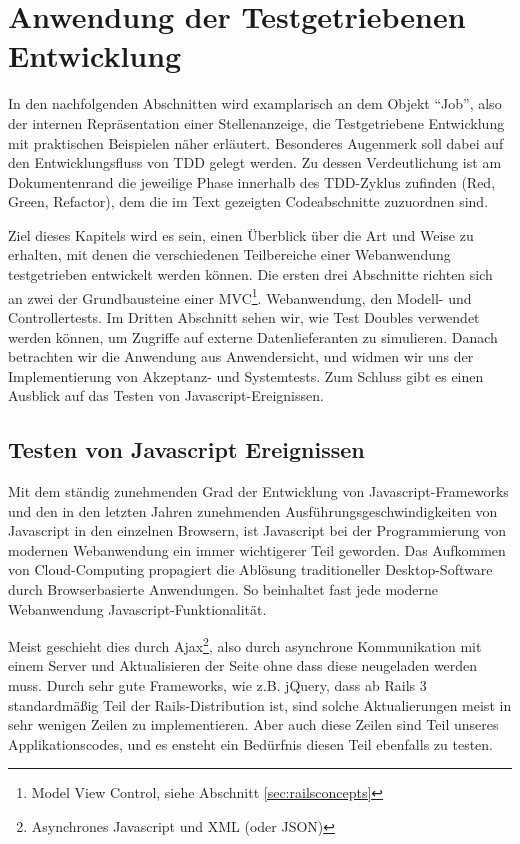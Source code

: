 \section{Anwendung der Testgetriebenen Entwicklung}
\label{sec:awtdd}

In den nachfolgenden Abschnitten wird examplarisch an dem Objekt "`Job"', also der internen Repräsentation einer Stellenanzeige, die Testgetriebene Entwicklung mit praktischen Beispielen näher erläutert.
Besonderes Augenmerk soll dabei auf den Entwicklungsfluss von TDD gelegt werden. Zu dessen Verdeutlichung ist am Dokumentenrand die jeweilige Phase innerhalb des TDD-Zyklus zufinden (Red, Green, Refactor), dem die im Text gezeigten Codeabschnitte zuzuordnen sind.

Ziel dieses Kapitels wird es sein, einen Überblick über die Art und Weise zu erhalten, mit denen die verschiedenen Teilbereiche einer Webanwendung testgetrieben entwickelt werden können.
Die ersten drei Abschnitte richten sich an zwei der Grundbausteine einer MVC\footnote{Model View Control, siehe Abschnitt \ref{sec:railsconcepts}}.
Webanwendung, den Modell- und Controllertests. Im Dritten Abschnitt sehen wir, wie Test Doubles verwendet werden können, um Zugriffe auf externe Datenlieferanten zu simulieren. Danach betrachten wir die Anwendung aus Anwendersicht, und widmen wir uns der Implementierung von Akzeptanz- und Systemtests. %
Zum Schluss gibt es einen Ausblick auf das Testen von Javascript-Ereignissen.






\subsection{Testen von Javascript Ereignissen}

Mit dem ständig zunehmenden Grad der Entwicklung von Javascript-Frameworks und den in den letzten Jahren zunehmenden Ausführungsgeschwindigkeiten von Javascript in den einzelnen Browsern, ist Javascript bei der Programmierung von modernen Webanwendung ein immer wichtigerer Teil geworden. Das Aufkommen von Cloud-Computing propagiert die Ablösung traditioneller Desktop-Software durch Browserbasierte Anwendungen. So beinhaltet fast jede moderne Webanwendung Javascript-Funktionalität.

Meist geschieht dies durch Ajax\footnote{Asynchrones Javascript und XML (oder JSON)}, also durch asynchrone Kommunikation mit einem Server und Aktualisieren der Seite ohne dass diese neugeladen werden muss. Durch sehr gute Frameworks, wie z.B. jQuery, dass ab Rails 3 standardmäßig Teil der Rails-Distribution ist, sind solche Aktualierungen meist in sehr wenigen Zeilen zu implementieren. Aber auch diese Zeilen sind Teil unseres Applikationscodes, und es ensteht ein Bedürfnis diesen Teil ebenfalls zu testen.

